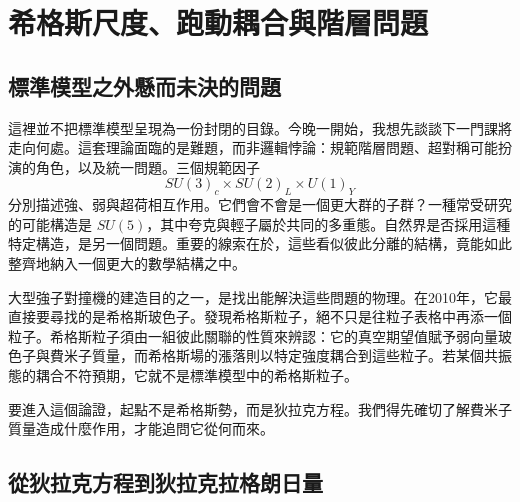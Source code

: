 \chapter{希格斯尺度、跑動耦合與階層問題}


\section{標準模型之外懸而未決的問題}

這裡並不把標準模型呈現為一份封閉的目錄。今晚一開始，我想先談談下一門課將走向何處。這套理論面臨的是難題，而非邏輯悖論：規範階層問題、超對稱可能扮演的角色，以及統一問題。三個規範因子
\begin{equation}
  SU(3)_c\times SU(2)_L\times U(1)_Y
  \label{eq:l10-standard-model-group}
\end{equation}
分別描述強、弱與超荷相互作用。它們會不會是一個更大群的子群？一種常受研究的可能構造是
\(SU(5)\)，其中夸克與輕子屬於共同的多重態。自然界是否採用這種特定構造，是另一個問題。重要的線索在於，這些看似彼此分離的結構，竟能如此整齊地納入一個更大的數學結構之中。

大型強子對撞機的建造目的之一，是找出能解決這些問題的物理。在2010年，它最直接要尋找的是希格斯玻色子。發現希格斯粒子，絕不只是往粒子表格中再添一個粒子。希格斯粒子須由一組彼此關聯的性質來辨認：它的真空期望值賦予弱向量玻色子與費米子質量，而希格斯場的漲落則以特定強度耦合到這些粒子。若某個共振態的耦合不符預期，它就不是標準模型中的希格斯粒子。

要進入這個論證，起點不是希格斯勢，而是狄拉克方程。我們得先確切了解費米子質量造成什麼作用，才能追問它從何而來。

\section{從狄拉克方程到狄拉克拉格朗日量}

